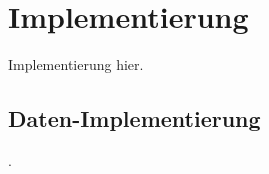 
\section{Implementierung}
\label{sec:daten:implementierung}

Implementierung hier.

\subsection{Daten-Implementierung}
\label{sec:daten_implementierung}

.
